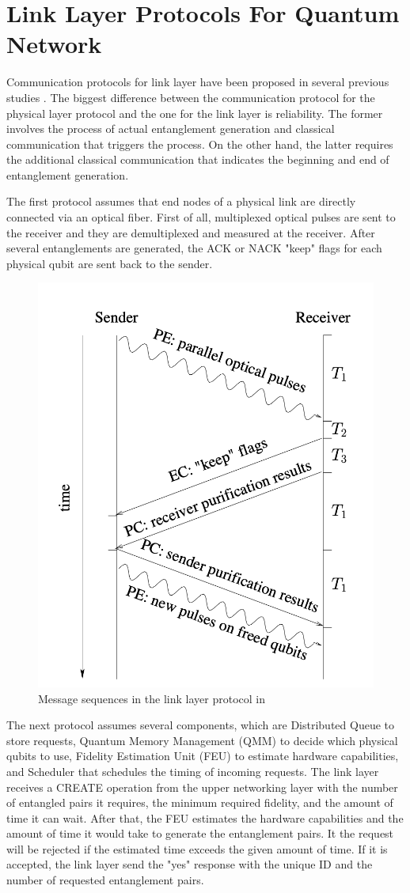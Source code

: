 \section{Link Layer Protocols For Quantum Network}

Communication protocols for link layer have been proposed in several previous studies \cite{Van_Meter_2009,Dahlberg_2019,matsuo2019simulation}.
The biggest difference between the communication protocol for the physical layer protocol and the one for the link layer is reliability.
The former involves the process of actual entanglement generation and classical communication that triggers the process. On the other hand, the latter requires the additional classical communication that indicates the beginning and end of entanglement generation.

The first protocol \cite{Van_Meter_2009} assumes that end nodes of a physical link are directly connected via an optical fiber. First of all, multiplexed optical pulses are sent to the receiver and they are demultiplexed and measured at the receiver.
After several entanglements are generated, the ACK or NACK "keep" flags for each physical qubit are sent back to the sender.
\begin{figure}[H]
  \centerline{\includegraphics[width=.5\columnwidth]{images/link_protocol_rdv.jpg}}
  \caption{Message sequences in the link layer protocol in  \cite{Van_Meter_2009}}
\end{figure}

The next protocol \cite{Dahlberg_2019} assumes several components, which are Distributed Queue to store requests, Quantum Memory Management (QMM) to decide which physical qubits to use, Fidelity Estimation Unit (FEU) to estimate hardware capabilities, and Scheduler that schedules the timing of incoming requests.
The link layer receives a CREATE operation from the upper networking layer with the number of entangled pairs it requires, the minimum required fidelity, and the amount of time it can wait.
After that, the FEU estimates the hardware capabilities and the amount of time it would take to generate the entanglement pairs.  It the request will be rejected if the estimated time exceeds the given amount of time.
If it is accepted, the link layer send the "yes" response with the unique ID and the number of requested entanglement pairs.

